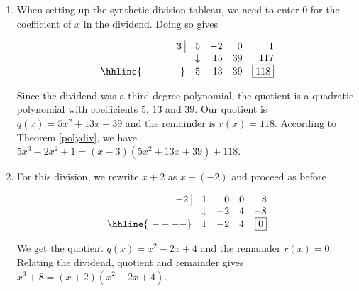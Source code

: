 {
\begin{enumerate}


\item When setting up the synthetic division tableau, we need to enter $0$ for the coefficient of $x$ in the dividend.  Doing so gives


\[ \begin{array}{rrrrr}


  3 \, \, \vline& 5 & -2 & 0  & 1 \\

   & \downarrow &  15  &  39  & 117 \\ \hhline{~----} 
  & 5  &   13  & 39  &  \fbox{$118$}  \\  
\end{array}\]

Since the dividend was a third degree polynomial, the quotient is a quadratic polynomial with coefficients $5$, $13$ and $39$.  Our quotient is $q(x) = 5x^2+13x+39$ and the remainder is $r(x) = 118$.  According to Theorem \ref{polydiv}, we have $5x^3 - 2x^2 + 1 = (x-3)\left(5x^2+13x+39 \right) + 118$.

\item  For this division, we rewrite $x+2$ as $x-(-2)$ and proceed as before

\[ \begin{array}{rrrrr}


  -2 \, \, \vline& 1 & 0 & 0  & 8 \\

   & \downarrow &  -2  &  4  & -8 \\ \hhline{~----} 
  & 1  &   -2  & 4  &  \fbox{$0$}  \\  
\end{array}\]

We get the quotient $q(x) = x^2-2x+4$ and the remainder $r(x) =0$. Relating the dividend, quotient and remainder gives $x^3+8 = (x+2)\left( x^2-2x+4 \right)$.  


\end{enumerate}}
